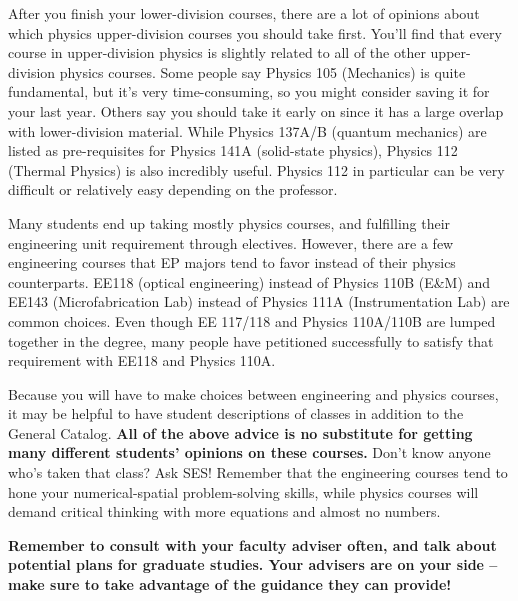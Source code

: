 After you finish your lower-division courses, there are a lot of opinions about which physics upper-division courses you should take first. You’ll find that every course in upper-division physics is slightly related to all of the other upper-division physics courses. Some people say Physics 105 (Mechanics) is quite fundamental, but it’s very time-consuming, so you might consider saving it for your last year. Others say you should take it early on since it has a large overlap with lower-division material. While Physics 137A/B (quantum mechanics) are listed as pre-requisites for Physics 141A (solid-state physics), Physics 112 (Thermal Physics) is also incredibly useful. Physics 112 in particular can be very difficult or relatively easy depending on the professor. 

Many students end up taking mostly physics courses, and fulfilling their engineering unit requirement through electives. However, there are a few engineering courses that EP majors tend to favor instead of their physics counterparts. EE118 (optical engineering) instead of Physics 110B (E\&M) and EE143 (Microfabrication Lab) instead of Physics 111A (Instrumentation Lab) are common choices. Even though EE 117/118 and Physics 110A/110B are lumped together in the degree, many people have petitioned successfully to satisfy that requirement with EE118 and Physics 110A. 

Because you will have to make choices between engineering and physics courses, it may be helpful to have student descriptions of classes in addition to the General Catalog. \textbf{All of the above advice is no substitute for getting many different students' opinions on these courses.} Don’t know anyone who’s taken that class? Ask SES! Remember that the engineering courses tend to hone your numerical-spatial problem-solving skills, while physics courses will demand critical thinking with more equations and almost no numbers.

\textbf{Remember to consult with your faculty adviser often, and talk about potential plans for graduate studies. Your advisers are on your side – make sure to take advantage of the guidance they can provide!}


